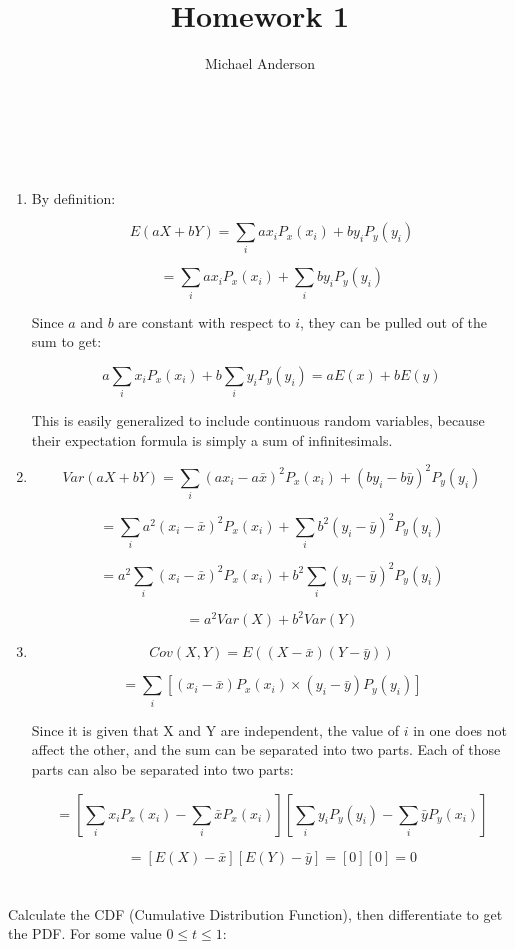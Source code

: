 \documentclass{article}
\author{Michael Anderson}
\title{Homework 1}
\begin{document}
\maketitle
{}
\\
\flushleft
\newpage

\section{}
\begin{enumerate}
\item
By definition:

\[
E(aX + bY) = \sum_i ax_i P_x(x_i) + by_i P_y(y_i)
\]

\[
 = \sum_i ax_i P_x(x_i) + \sum_i by_i P_y(y_i)
\]

Since $a$ and $b$ are constant with respect to $i$, they can be pulled out of
the sum to get:

\[
a \sum_i x_i P_x(x_i) + b \sum_i y_i P_y(y_i) = aE(x) + bE(y)
\]

This is easily generalized to include continuous random variables, because
their expectation formula is simply a sum of infinitesimals.

\item
\[
Var(aX + bY) = \sum_i (ax_i-a \bar{x})^2 P_x(x_i) + (by_i-b \bar{y})^2 P_y(y_i)
\]

\[
= \sum_i a^2 (x_i - \bar{x})^2 P_x(x_i) + \sum_i b^2 (y_i - \bar{y})^2 P_y(y_i)
\]

\[
= a^2 \sum_i (x_i - \bar{x})^2 P_x(x_i) + b^2 \sum_i (y_i-\bar{y})^2 P_y(y_i)
\]

\[
= a^2 Var(X) + b^2 Var(Y)
\]

\item
\[
Cov(X,Y) = E((X-\bar{x})(Y-\bar{y}))
\]

\[
= \sum_i [(x_i-\bar{x})P_x(x_i) \times (y_i-\bar{y})P_y(y_i)]
\]

Since it is given that X and Y are independent, the value of $i$ in one does
not affect the other, and the sum can be separated into two parts. Each of
those parts can also be separated into two parts:

\[
= [\sum_i x_i P_x(x_i) - \sum_i \bar{x}P_x(x_i)]
[\sum_i y_i P_y(y_i) - \sum_i \bar{y}P_y(x_i)]
\]

\[
= [E(X) - \bar{x}][E(Y) - \bar{y}] = [0][0] = 0
\]
\end{enumerate}

\newpage

\section{}
Calculate the CDF (Cumulative Distribution Function), then differentiate to get 
the PDF. For some value $0 \le t \le 1$:
\end{document}
